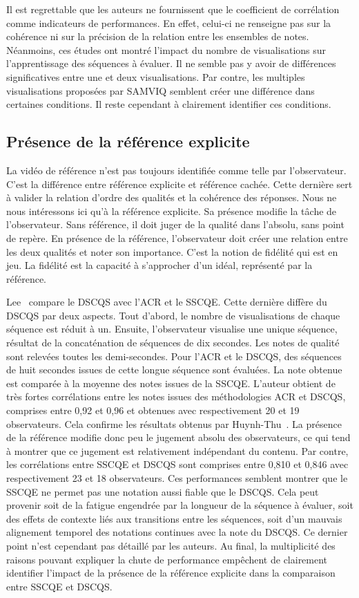 Il est regrettable que les auteurs ne fournissent que le coefficient de corrélation comme indicateurs de performances. En effet, celui-ci ne renseigne pas sur la cohérence ni sur la précision de la relation entre les ensembles de notes. Néanmoins, ces études ont montré l'impact du nombre de visualisations sur l'apprentissage des séquences à évaluer. Il ne semble pas y avoir de différences significatives entre une et deux visualisations. Par contre, les multiples visualisations proposées par SAMVIQ semblent créer une différence dans certaines conditions. Il reste cependant à clairement identifier ces conditions.


\subsection{Présence de la référence explicite}
La vidéo de référence n'est pas toujours identifiée comme telle par l'observateur. C'est la différence entre référence explicite et référence cachée. Cette dernière sert à valider la relation d'ordre des qualités et la cohérence des réponses. Nous ne nous intéressons ici qu'à la référence explicite. Sa présence modifie la tâche de l'observateur. Sans référence, il doit juger de la qualité dans l'absolu, sans point de repère. En présence de la référence, l'observateur doit créer une relation entre les deux qualités et noter son importance. C'est la notion de fidélité qui est en jeu. La fidélité est la capacité à s'approcher d'un idéal, représenté par la référence.

Lee~\cite{lee-ie2006} compare le DSCQS avec l'ACR et le SSCQE. Cette dernière diffère du DSCQS par deux aspects. Tout d'abord, le nombre de visualisations de chaque séquence est réduit à un. Ensuite, l'observateur visualise une unique séquence, résultat de la concaténation de séquences de dix secondes. Les notes de qualité sont relevées toutes les demi-secondes. Pour l'ACR et le DSCQS, des séquences de huit secondes issues de cette longue séquence sont évaluées. La note obtenue est comparée à la moyenne des notes issues de la SSCQE. L'auteur obtient de très fortes corrélations entre les notes issues des méthodologies ACR et DSCQS, comprises entre 0,92 et 0,96 et obtenues avec respectivement 20 et 19 observateurs. Cela confirme les résultats obtenus par Huynh-Thu~\cite{huynhthu-sip2005}. La présence de la référence modifie donc peu le jugement absolu des observateurs, ce qui tend à montrer que ce jugement est relativement indépendant du contenu. Par contre, les corrélations entre SSCQE et DSCQS sont comprises entre 0,810 et 0,846 avec respectivement 23 et 18 observateurs. Ces performances semblent montrer que le SSCQE ne permet pas une notation aussi fiable que le DSCQS. Cela peut provenir soit de la fatigue engendrée par la longueur de la séquence à évaluer, soit des effets de contexte liés aux transitions entre les séquences, soit d'un mauvais alignement temporel des notations continues avec la note du DSCQS. Ce dernier point n'est cependant pas détaillé par les auteurs. Au final, la multiplicité des raisons pouvant expliquer la chute de performance empêchent de clairement identifier l'impact de la présence de la référence explicite dans la comparaison entre SSCQE et DSCQS.


